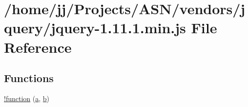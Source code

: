\hypertarget{jquery-1_811_81_8min_8js}{}\section{/home/jj/\+Projects/\+A\+S\+N/vendors/jquery/jquery-\/1.11.1.min.\+js File Reference}
\label{jquery-1_811_81_8min_8js}
\subsection*{Functions}
\begin{DoxyCompactItemize}
\item 
\hyperlink{jquery-1_811_81_8min_8js_a43f0b96ea8ec44ca20ba86809a785614}{!function} (\hyperlink{_chart_8min_8js_aef3b685c08bc6c76c8e729bd0e93901d}{a}, \hyperlink{bootstrap_8min_8js_a398bb8542498d1b14178b02b99df309b}{b})
\item 

\end{DoxyCompactItemize}
